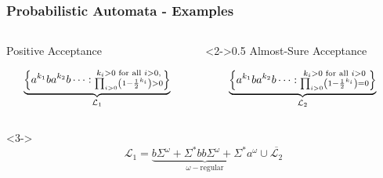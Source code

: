 \documentclass{beamer}
\begin{document}
  \begin{frame}
    \frametitle{Probabilistic Automata - Examples}
    \begin{columns}
      \begin{column}{0.5\textwidth}
        \small{Positive Acceptance}
        \begin{center}
        \end{center}
        \begin{equation*}
          \underbrace{
              \left\{a^{k_{1}}ba^{k_{2}}b\dots:
              \substack{k_{i}>0\text{ for all }i>0,\\
              \prod_{i>0}\left(1-\frac{1}{2}^{k_{i}}\right) > 0}
            \right\}
          }_{\mathcal{L}_{1}}
        \end{equation*}
      \end{column}
      \begin{column}<2->{0.5\textwidth}
        \small{Almost-Sure Acceptance}
        \begin{center}
        \end{center}
        \begin{equation*}
          \underbrace{
            \left\{
              a^{k_{1}}ba^{k_{2}}b\dots:
              \substack{k_{i}>0\text{ for all }i>0\\
              \prod_{i>0}\left(1-\frac{1}{2}^{k_{i}}\right) = 0}
            \right\}
          }_{\mathcal{L}_{2}}
        \end{equation*}
      \end{column}
    \end{columns}
    \begin{uncoverenv}<3->
      \begin{equation*}
        \mathcal{L}_{1} = \underbrace{
          b\Sigma^{\omega} + \Sigma^{*}bb\Sigma^{\omega} + \Sigma^{*}a^{\omega}
        }_{\omega-\text{regular}}\cup\overline{\mathcal{L}_{2}}
      \end{equation*}
    \end{uncoverenv}
  \end{frame}
\end{document}
